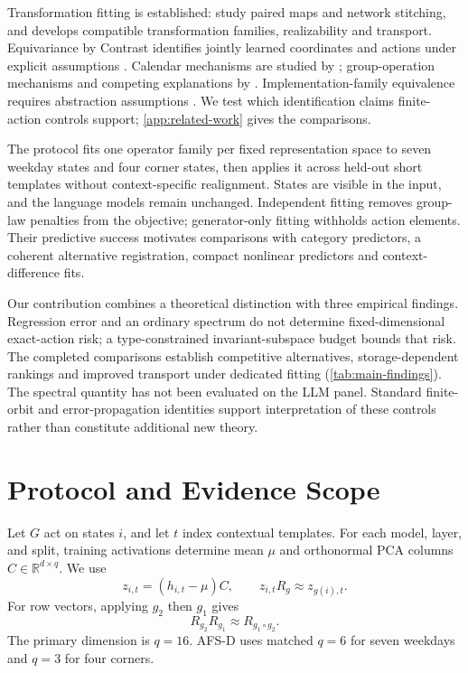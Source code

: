 \documentclass{article}
\newcommand{\R}{\mathbb{R}}
\begin{document}
Transformation fitting is established: \citet{lenc2015understanding} study paired maps and network stitching, and \citet{sun2026transformationlaws} develops compatible transformation families, realizability and transport. Equivariance by Contrast identifies jointly learned coordinates and actions under explicit assumptions \citep{schmidt2025equivariance}. Calendar mechanisms are studied by \citet{engels2025notall}; group-operation mechanisms and competing explanations by \citet{nanda2023progress,chughtai2023toy,wu2025unified}. Implementation-family equivalence requires abstraction assumptions \citep{sun2026tracking}. We test which identification claims finite-action controls support; \cref{app:related-work} gives the comparisons.

The protocol fits one operator family per fixed representation space to seven weekday states and four corner states, then applies it across held-out short templates without context-specific realignment. States are visible in the input, and the language models remain unchanged. Independent fitting removes group-law penalties from the objective; generator-only fitting withholds action elements. Their predictive success motivates comparisons with category predictors, a coherent alternative registration, compact nonlinear predictors and context-difference fits.



Our contribution combines a theoretical distinction with three empirical findings. Regression error and an ordinary spectrum do not determine fixed-dimensional exact-action risk; a type-constrained invariant-subspace budget bounds that risk. The completed comparisons establish competitive alternatives, storage-dependent rankings and improved transport under dedicated fitting (\cref{tab:main-findings}). The spectral quantity has not been evaluated on the LLM panel. Standard finite-orbit and error-propagation identities support interpretation of these controls rather than constitute additional new theory.

\section{Protocol and Evidence Scope}
\label{sec:setup}
Let $G$ act on states $i$, and let $t$ index contextual templates. For each model, layer, and split, training activations determine mean $\mu$ and orthonormal PCA columns $C\in\R^{d\times q}$. We use
\begin{equation}
 z_{i,t}=(h_{i,t}-\mu)C,\qquad z_{i,t}R_g\approx z_{g(i),t}.
\end{equation}
For row vectors, applying $g_2$ then $g_1$ gives
\begin{equation}
 R_{g_2}R_{g_1}\approx R_{g_1\circ g_2}.
 \label{eq:convention}
\end{equation}
The primary dimension is $q=16$. AFS-D uses matched $q=6$ for seven weekdays and $q=3$ for four corners.
\end{document}
